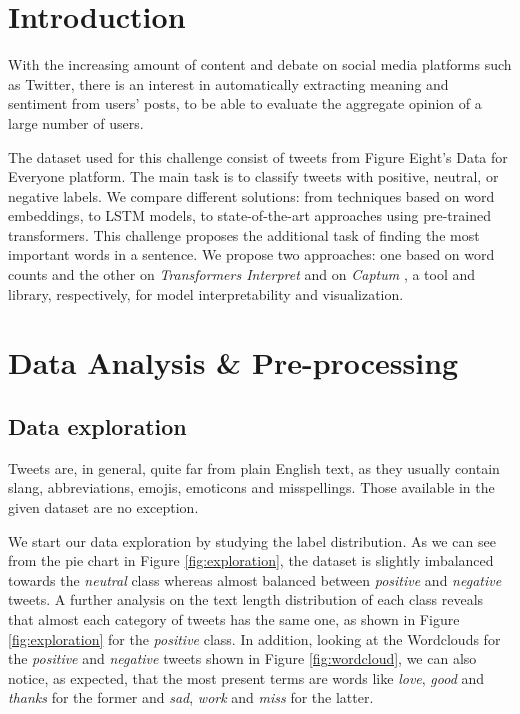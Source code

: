 \documentclass{article}
\begin{document}
	
	
\section{Introduction}
With the increasing amount of content and debate on social media platforms such as Twitter, there is an interest in automatically extracting meaning and sentiment from users' posts, to be able to evaluate the aggregate opinion of a large number of users.

The dataset used for this challenge consist of tweets from Figure Eight's Data for Everyone platform. The main task is to classify tweets with positive, neutral, or negative labels. We compare different solutions: from techniques based on word embeddings, to LSTM models, to state-of-the-art approaches using pre-trained transformers.
This challenge proposes the additional task of finding the most important words in a sentence. We propose two approaches: one based on word counts and the other on \textit{Transformers Interpret} and on \textit{Captum} \cite{kokhlikyan2020captum}, a tool and library, respectively, for model interpretability and visualization. 



\section{Data Analysis \& Pre-processing}
    \subsection{Data exploration}
    Tweets are, in general, quite far from plain English text, as they usually contain slang, abbreviations, emojis, emoticons and misspellings. Those available in the given dataset are no exception. 
    
    We start our data exploration by studying the label distribution. As we can see from the pie chart in Figure \ref{fig:exploration}, the dataset is slightly imbalanced towards the \textit{neutral} class whereas almost balanced between \textit{positive} and \textit{negative} tweets. A further analysis on the text length distribution of each class reveals that almost each category of tweets has the same one, as shown in Figure \ref{fig:exploration} for the \textit{positive} class.
    In addition, looking at the Wordclouds for the \textit{positive} and \textit{negative} tweets shown in Figure \ref{fig:wordcloud}, we can also notice, as expected, that the most present terms are words like \textit{love}, \textit{good} and \textit{thanks} for the former and \textit{sad}, \textit{work} and \textit{miss} for the latter.   
    
\end{document}
